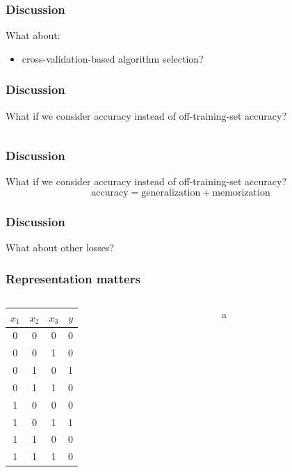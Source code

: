\documentclass[mathserif, aspectratio=43]{beamer}
\begin{document}
\begin{frame}[fragile]
\frametitle{Discussion}
What about:
\begin{itemize}
\item cross-validation-based algorithm selection?
\end{itemize}

\end{frame}


\begin{frame}[fragile]
\frametitle{Discussion}
{\Large What if we consider accuracy instead of off-training-set accuracy? }
{ \Large $$\phantom{\mathrm{accuracy} = \mathrm{generalization} + \mathrm{memorization} }$$}

\end{frame}


\begin{frame}[fragile]
\frametitle{Discussion}
{\Large What if we consider accuracy instead of off-training-set accuracy? }
{ \Large $$\mathrm{accuracy} = \mathrm{generalization} + \mathrm{memorization}$$}

\end{frame}


\begin{frame}[fragile]
\frametitle{Discussion}
{\Large What about other losses? }

\end{frame}


\begin{frame}[fragile]
\frametitle{Representation matters}
\begin{columns}
\begin{column}{0.4875\textwidth}
\begin{tabular}{ c c c | c }
$x_1$ & $x_2$ & $x_3$ & $y$ \\
\hline
0 & 0 & 0 & 0\\
\hline
0 & 0 & 1 & 0\\
\hline
0 & 1 & 0 & 1\\
\hline
0 & 1 & 1 & 0\\
\hline
1 & 0 & 0 & 0\\
\hline
1 & 0 & 1 & 1\\
\hline
1 & 1 & 0 & 0\\
\hline
1 & 1 & 1 & 0\\
\end{tabular}

\end{column}
\begin{column}{0.4875\textwidth}
\begin{phantom}
a
\end{phantom}

\end{column}
\end{columns}

\end{frame}
\end{document}
